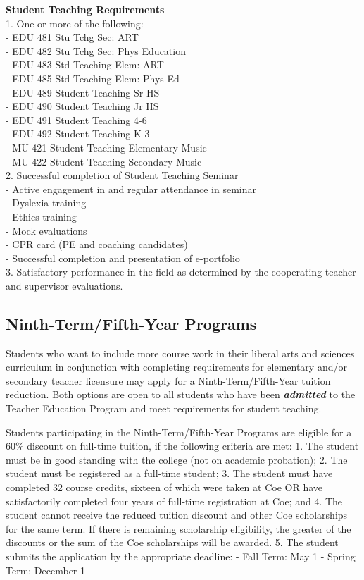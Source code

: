 \documentclass[
  letterpaper,
]{scrbook}
\begin{document}
\textbf{Student Teaching Requirements}\\
1. One or more of the following:\\
- EDU 481 Stu Tchg Sec: ART\\
- EDU 482 Stu Tchg Sec: Phys Education\\
- EDU 483 Std Teaching Elem: ART\\
- EDU 485 Std Teaching Elem: Phys Ed\\
- EDU 489 Student Teaching Sr HS\\
- EDU 490 Student Teaching Jr HS\\
- EDU 491 Student Teaching 4-6\\
- EDU 492 Student Teaching K-3\\
- MU 421 Student Teaching Elementary Music\\
- MU 422 Student Teaching Secondary Music\\
2. Successful completion of Student Teaching Seminar\\
- Active engagement in and regular attendance in seminar\\
- Dyslexia training\\
- Ethics training\\
- Mock evaluations\\
- CPR card (PE and coaching candidates)\\
- Successful completion and presentation of e-portfolio\\
3. Satisfactory performance in the field as determined by the
cooperating teacher and supervisor evaluations.

\subsection{Ninth-Term/Fifth-Year
Programs}\label{ninth-termfifth-year-programs}

Students who want to include more course work in their liberal arts and
sciences curriculum in conjunction with completing requirements for
elementary and/or secondary teacher licensure may apply for a
Ninth-Term/Fifth-Year tuition reduction. Both options are open to all
students who have been \textbf{\emph{admitted}} to the Teacher Education
Program and meet requirements for student teaching.

Students participating in the Ninth-Term/Fifth-Year Programs are
eligible for a 60\% discount on full-time tuition, if the following
criteria are met: 1. The student must be in good standing with the
college (not on academic probation); 2. The student must be registered
as a full-time student; 3. The student must have completed 32 course
credits, sixteen of which were taken at Coe OR have satisfactorily
completed four years of full-time registration at Coe; and 4. The
student cannot receive the reduced tuition discount and other Coe
scholarships for the same term. If there is remaining scholarship
eligibility, the greater of the discounts or the sum of the Coe
scholarships will be awarded. 5. The student submits the application by
the appropriate deadline: - Fall Term: May 1 - Spring Term: December 1
\end{document}
